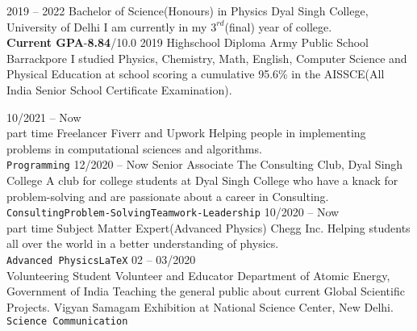 \documentclass[9pt]{developercv} %
\begin{document}


\begin{entrylist}
	

	\entry
		{2019 -- 2022}
		{Bachelor of Science(Honours) in Physics}
		{Dyal Singh College, University of Delhi}
		{I am currently in my $3^{rd}$(final) year of college.\\ \textbf{Current GPA}-\textbf{8.84}/10.0}
	\entry
		{2019}
		{Highschool Diploma}
		{Army Public School Barrackpore}
		{I studied Physics, Chemistry, Math, English, Computer Science and Physical Education at school scoring a cumulative 95.6\% in the AISSCE(All India Senior School Certificate Examination).}
\end{entrylist}




\begin{entrylist}
	\entry
		{10/2021 -- Now\\\footnotesize{part time}}
		{Freelancer}
		{Fiverr and Upwork}
		{Helping people in implementing problems in computational sciences and algorithms.\\ \texttt{Programming}}
	\entry
		{12/2020 -- Now}
		{Senior Associate}
		{The Consulting Club, Dyal Singh College}
		{A club for college students at Dyal Singh College who have a knack for problem-solving and are passionate about a career in Consulting.\\ 
		\texttt{Consulting}\slashsep\texttt{Problem-Solving}\slashsep\texttt{Teamwork-Leadership}}
	\entry
		{10/2020 -- Now\\\footnotesize{part time}}
		{Subject Matter Expert(Advanced Physics)}
		{Chegg Inc.}
		{Helping students all over the world in a better understanding of physics.\\ \texttt{Advanced Physics}\slashsep\texttt{LaTeX}}
	\entry
		{02 -- 03/2020\\\footnotesize{Volunteering}}
		{Student Volunteer and Educator}
		{Department of Atomic Energy, Government of India}
		{Teaching the general public about current Global Scientific Projects. Vigyan Samagam Exhibition at National Science Center, New Delhi.\\ 
		\texttt{Science Communication}}
\end{entrylist}
\end{document}
